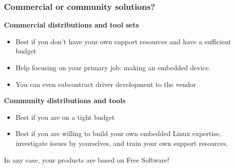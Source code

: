 \begin{frame}
  \frametitle{Commercial or community solutions?}
  {\bf Commercial distributions and tool sets}
  \begin{itemize}
  \item Best if you don't have your own support resources and have a
    sufficient budget
  \item Help focusing on your primary job: making an embedded device.
  \item You can even subcontract driver development to the vendor
  \end{itemize}
  {\bf Community distributions and tools}
  \begin{itemize}
  \item Best if you are on a tight budget
  \item Best if you are willing to build your own embedded Linux
    expertise, investigate issues by yourselves, and train your own
    support resources.
  \end{itemize}
  In any case, your products are based on Free Software!
\end{frame}
